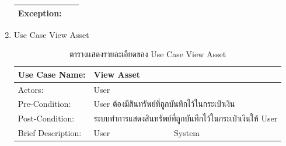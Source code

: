 \documentclass[12pt,oneside,openright,a4paper]{cpe-thai-project}
\begin{document}
\begin{enumerate}[label=\thesubsection.\arabic*,leftmargin=0pt,itemindent=1.25cm]
\begin{table}[h]
\begin{tabularx}{\textwidth}{|l|X|X|}
\hline
Exception:           & \multicolumn{2}{l|}{~}                                                                                                                                                                                                                                                                                                                                                                \\
\hline
\end{tabularx}
\end{table}
\FloatBarrier
\clearpage
\item Use Case View Asset
	\begin{table}[h]
\centering
\caption{ตารางแสดงรายละเอียดของ Use Case View Asset}
\begin{tabularx}{\textwidth}{|l|X|X|} 
\hline
Use Case
  Name:     & \multicolumn{2}{l|}{View Asset}                                                                                                                                                                                                                                                                                    \\ 
\hline
Actors:              & \multicolumn{2}{l|}{User}                                                                                                                                                                                                                                                                                          \\ 
\hline
Pre-Condition:       & \multicolumn{2}{l|}{User ต้องมีสินทรัพย์ที่ถูกบันทึกไว้ในกระเป๋าเงิน}                                                                                                                                                                                                                                              \\ 
\hline
Post-Condition:      & \multicolumn{2}{l|}{ระบบทำการแสดงสินทรัพย์ที่ถูกบันทึกไว้ในกระเป๋าเงินให้
  User}                                                                                                                                                                                                                                  \\ 
\hline
Brief
  Description: & User                                                                                                                              & System                                                                                                                                                                         \\ 

\end{tabularx}
\end{table}
\end{enumerate}
\end{document}
